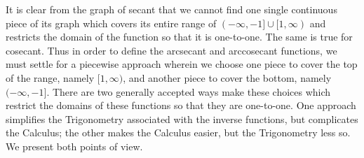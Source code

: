 \documentclass[12pt]{ximera}
\begin{document}
\begin{tabular}{cc}
\\

\end{tabular}

\bigskip

It is clear from the graph of secant that we cannot find one single continuous piece of its graph which covers its entire range of $(-\infty, -1] \cup [1, \infty)$ and restricts the domain of the function so that it is one-to-one.  The same is true for cosecant.  Thus in order to define the arcsecant and arccosecant functions, we must settle for a piecewise approach wherein we choose one piece to cover the top of the range, namely  $[1, \infty)$, and another piece to cover the bottom, namely $(-\infty, -1]$.  There are two generally accepted ways make these choices which restrict the domains of these functions so that they are one-to-one.  One approach simplifies the Trigonometry associated with the inverse functions, but complicates the Calculus;  the other makes the Calculus easier, but the Trigonometry less so.  We present both points of view.
\end{document}
